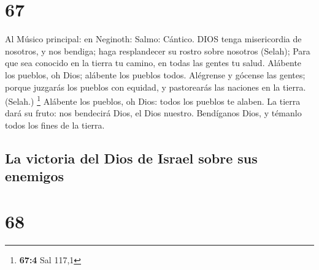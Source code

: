 \hypertarget{section-66}{%
\section{67}\label{section-66}}

 Al Músico principal: en Neginoth: Salmo: Cántico. DIOS
tenga misericordia de nosotros, y nos bendiga; haga resplandecer su
rostro sobre nosotros (Selah);  Para que sea conocido en la
tierra tu camino, en todas las gentes tu salud.  Alábente
los pueblos, oh Dios; alábente los pueblos todos.  Alégrense
y gócense las gentes; porque juzgarás los pueblos con equidad, y
pastorearás las naciones en la tierra. (Selah.) \footnote{\textbf{67:4}
  Sal 117,1}  Alábente los pueblos, oh Dios: todos los
pueblos te alaben.  La tierra dará su fruto: nos bendecirá
Dios, el Dios nuestro.  Bendíganos Dios, y témanlo todos los
fines de la tierra.

\hypertarget{la-victoria-del-dios-de-israel-sobre-sus-enemigos}{%
\subsection{La victoria del Dios de Israel sobre sus
enemigos}\label{la-victoria-del-dios-de-israel-sobre-sus-enemigos}}

\hypertarget{section-67}{%
\section{68}\label{section-67}}

